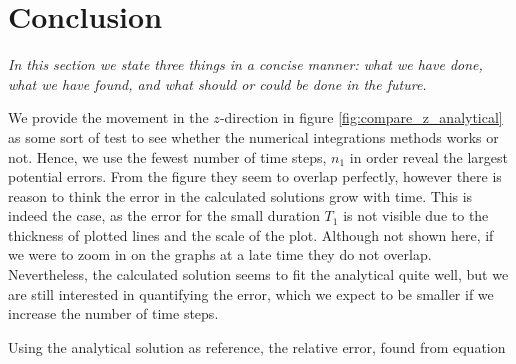 \section{Conclusion}\label{sec:conclusion}
\textit{In this section we state three things in a concise manner: what we have done, what we have found, and what should or could be done in the future.}

We provide the movement in the $z$-direction in figure \ref{fig:compare_z_analytical} as some sort of test to see whether the numerical integrations methods works or not. Hence, we use the fewest number of time steps, $n_1$ in order reveal the largest potential errors. From the figure they seem to overlap perfectly, however there is reason to think the error in the calculated solutions grow with time. This is indeed the case, as the error for the small duration $T_1$ is not visible due to the thickness of plotted lines and the scale of the plot. Although not shown here, if we were to zoom in on the graphs at a late time they do not overlap. Nevertheless, the calculated solution seems to fit the analytical quite well, but we are still interested in quantifying the error, which we expect to be smaller if we increase the number of time steps. 

Using the analytical solution as reference, the relative error, found from equation 


